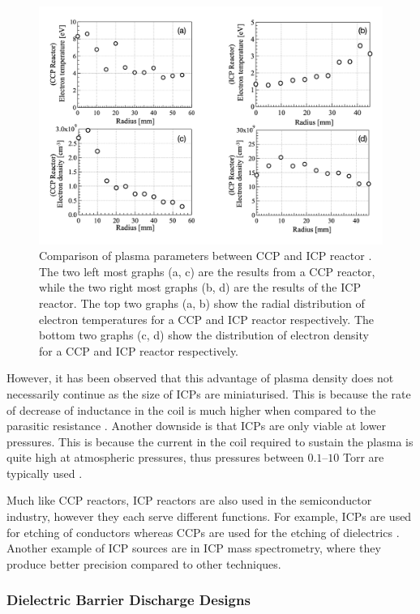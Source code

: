 \begin{figure}[h!]
	\centering
	\includegraphics[width=\linewidth]{chapter_2/figures/CCP_vs_ICP_reactor.png}
	\caption{Comparison of plasma parameters between CCP and ICP reactor \cite{Sakamoto2009ComparisonOP}. The two left most graphs (a, c) are the results from a CCP reactor, while the two right most graphs (b, d) are the results of the ICP reactor. The top two graphs (a, b) show the radial distribution of electron temperatures for a CCP and ICP reactor respectively. The bottom two graphs (c, d) show the distribution of electron density for a CCP and ICP reactor respectively.}
	\label{fig:CCP_vs_ICP}
\end{figure} 


However, it has been observed that this advantage of plasma density does not necessarily continue as the size of ICPs are miniaturised. This is because the rate of decrease of inductance in the coil is much higher when compared to the parasitic resistance \cite{Iza2008}. Another downside is that ICPs are only viable at lower pressures. This is because the current in the coil required to sustain the plasma is quite high at atmospheric pressures, thus pressures between $0.1–10$ Torr are typically used \cite{Hopwood2004}.

Much like CCP reactors, ICP reactors are also used in the semiconductor industry, however they each serve different functions. For example, ICPs are used for etching of conductors whereas CCPs are used for the etching of dielectrics \cite{Kruger2020}. Another example of ICP sources are in ICP mass spectrometry, where they produce better precision compared to other techniques.


\subsubsection{Dielectric Barrier Discharge Designs}

